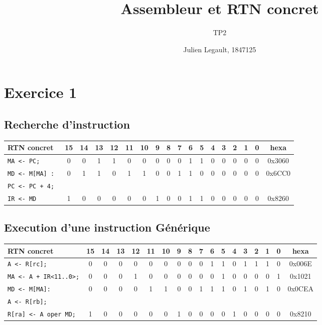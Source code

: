 \documentclass{article}
\title{Assembleur et RTN concret}
\subtitle{TP2}
\author{Julien Legault, 1847125}{Billy Bouchard, 1850477}{Groupe B1}%
\begin{document}
\maketitle
\section*{Exercice 1}
\subsection*{Recherche d'instruction}
\begin{tabular}{ | l *{17}{|c}|}
	\hline
	\textbf{RTN concret}  & 15 & 14 & 13 & 12 & 11 & 10 & 9 & 8 & 7 & 6 & 5 & 4 & 3 & 2 & 1 & 0 & \textbf{hexa} \\ \hline \hline
	\verb|MA <- PC;|      & 0  & 0  & 1  & 1  & 0  & 0  & 0 & 0 & 0 & 1 & 1 & 0 & 0 & 0 & 0 & 0 & 0x3060        \\ \hline
	\verb|MD <- M[MA] : | & 0  & 1  & 1  & 0  & 1  & 1  & 0 & 0 & 1 & 1 & 0 & 0 & 0 & 0 & 0 & 0 & 0x6CC0        \\
	\verb|PC <- PC + 4; | &    &    &    &    &    &    &   &   &   &   &   &   &   &   &   &   &               \\ \hline
	\verb|IR <- MD|       & 1  & 0  & 0  & 0  & 0  & 0  & 1 & 0 & 0 & 1 & 1 & 0 & 0 & 0 & 0 & 0 & 0x8260        \\ \hline
\end{tabular}

\subsection*{Execution d'une instruction G\'en\'erique}
\begin{tabular}{ | l *{17}{|c}|}
	\hline
	\textbf{RTN concret}        & 15 & 14 & 13 & 12 & 11 & 10 & 9 & 8 & 7 & 6 & 5 & 4 & 3 & 2 & 1 & 0 & \textbf{hexa} \\ \hline \hline
	\verb|A <- R[rc];|          & 0  & 0  & 0  & 0  & 0  & 0  & 0 & 0 & 0 & 1 & 1 & 0 & 1 & 1 & 1 & 0 & 0x006E        \\ \hline
	\verb|MA <- A + IR<11..0>;| & 0  & 0  & 0  & 1  & 0  & 0  & 0 & 0 & 0 & 0 & 1 & 0 & 0 & 0 & 0 & 1 & 0x1021        \\ \hline
	\verb|MD <- M[MA]:|         & 0  & 0  & 0  & 0  & 1  & 1  & 0 & 0 & 1 & 1 & 1 & 0 & 1 & 0 & 1 & 0 & 0x0CEA        \\
	\verb|A <- R[rb];|          &    &    &    &    &    &    &   &   &   &   &   &   &   &   &   &   &               \\ \hline
	\verb|R[ra] <- A oper MD;|  & 1  & 0  & 0  & 0  & 0  & 0  & 1 & 0 & 0 & 0 & 0 & 1 & 0 & 0 & 0 & 0 & 0x8210        \\ \hline
\end{tabular}
\end{document}
